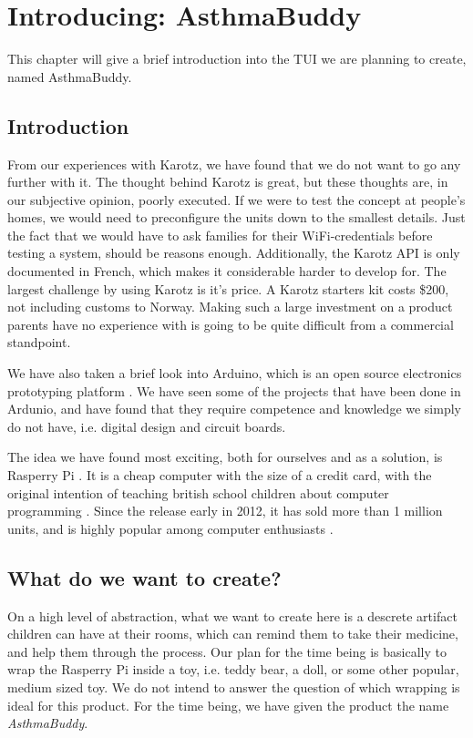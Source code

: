 
\chapter{Introducing: AsthmaBuddy}
\label{chp:our-solution}

This chapter will give a brief introduction into the TUI we are planning to create, named AsthmaBuddy. 

\section{Introduction}
\label{sec:our-solution-introduction}
From our experiences with Karotz, we have found that we do not want to go any further with it. The thought behind Karotz is great, but these thoughts are, in our subjective opinion, poorly executed. If we were to test the concept at people's homes, we would need to preconfigure the units down to the smallest details. Just the fact that we would have to ask families for their WiFi-credentials before testing a system, should be reasons enough.
Additionally, the Karotz API is only documented in French, which makes it considerable harder to develop for. The largest challenge by using Karotz is it's price. A Karotz starters kit costs \$200, not including customs to Norway. Making such a large investment on a product parents have no experience with is going to be quite difficult from a commercial standpoint.  



We have also taken a brief look into Arduino, which is an open source electronics prototyping platform \cite{arduino}. We have seen some of the projects that have been done in Ardunio, and have found that they require competence and knowledge we simply do not have, i.e. digital design and circuit boards. 


The idea we have found most exciting, both for ourselves and as a solution, is Rasperry Pi \cite{rasperrypi}. It is a cheap computer with the size of a credit card, with the original intention of teaching british school children about computer programming \cite{rasperrypi-about}. Since the release early in 2012, it has sold more than 1 million units, and is highly popular among computer enthusiasts \cite{pimillion}. 


\section{What do we want to create?}
On a high level of abstraction, what we want to create here is a descrete artifact children can have at their rooms, which can remind them to take their medicine, and help them through the process. Our plan for the time being is basically to wrap the Rasperry Pi inside a toy, i.e. teddy bear, a doll, or some other popular, medium sized toy. We do not intend to answer the question of which wrapping is ideal for this product. For the time being, we have given the product the name \emph{AsthmaBuddy}. 

